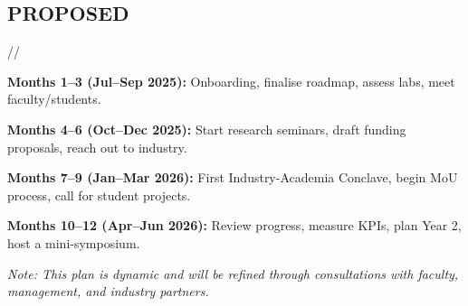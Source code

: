 \documentclass[]{deedy-resume-reversed}
\begin{document}
\subsection*{PROPOSED}//
\begin{tightemize}
    \item \textbf{Months 1–3 (Jul–Sep 2025):} Onboarding, finalise roadmap, assess labs, meet faculty/students.
    \item \textbf{Months 4–6 (Oct–Dec 2025):} Start research seminars, draft funding proposals, reach out to industry.
    \item \textbf{Months 7–9 (Jan–Mar 2026):} First Industry-Academia Conclave, begin MoU process, call for student projects.
    \item \textbf{Months 10–12 (Apr–Jun 2026):} Review progress, measure KPIs, plan Year 2, host a mini-symposium.
\end{tightemize}

\vspace{0.3cm}
\textit{Note: This plan is dynamic and will be refined through consultations with faculty, management, and industry partners.}

\end{document}
